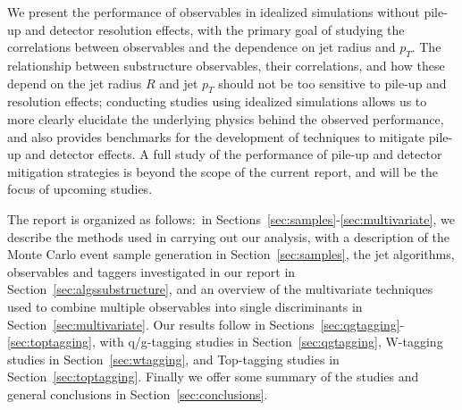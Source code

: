 
We present the performance of observables in idealized simulations without pile-up and detector resolution effects, with the primary goal of studying the correlations between observables and the dependence on jet radius and $p_{T}$.
The relationship between substructure observables, their correlations, and how these depend on the jet radius $R$ and jet $p_T$ should not be too sensitive to pile-up and resolution effects; conducting  studies using idealized simulations allows us to more clearly elucidate the underlying physics behind the observed performance, and also provides benchmarks for the development of techniques to mitigate pile-up and detector effects. A full study of the performance of pile-up and detector mitigation strategies is beyond the scope of the current report, and will be the focus of upcoming studies.

The report is organized as follows:~in Sections~\ref{sec:samples}-\ref{sec:multivariate}, we describe the methods used in carrying out our analysis, with a description of the Monte Carlo event sample generation in Section~\ref{sec:samples}, the jet algorithms, observables and taggers investigated in our report in Section~\ref{sec:algssubstructure}, and an overview of the multivariate techniques used to combine multiple observables into single discriminants in Section~\ref{sec:multivariate}. Our results follow in Sections~\ref{sec:qgtagging}-\ref{sec:toptagging}, with q/g-tagging studies in Section~\ref{sec:qgtagging}, W-tagging studies in Section~\ref{sec:wtagging}, and Top-tagging studies in Section~\ref{sec:toptagging}. Finally we offer some summary of the studies and general conclusions in Section~\ref{sec:conclusions}.\\


